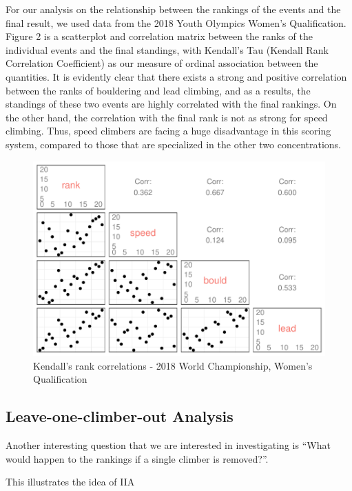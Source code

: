 \documentclass[12pt]{article}
\begin{document}
For our analysis on the relationship between the rankings of the events
and the final result, we used data from the 2018 Youth Olympics Women's
Qualification. Figure 2 is a scatterplot and correlation matrix between
the ranks of the individual events and the final standings, with
Kendall's Tau (Kendall Rank Correlation Coefficient) as our measure of
ordinal association between the quantities. It is evidently clear that
there exists a strong and positive correlation between the ranks of
bouldering and lead climbing, and as a results, the standings of these
two events are highly correlated with the final rankings. On the other
hand, the correlation with the final rank is not as strong for speed
climbing. Thus, speed climbers are facing a huge disadvantage in this
scoring system, compared to those that are specialized in the other two
concentrations.

\begin{figure}
\centering
\includegraphics{draft_files/figure-latex/unnamed-chunk-9-1.pdf}
\caption{Kendall's rank correlations - 2018 World Championship, Women's
Qualification}
\end{figure}

\hypertarget{leave-one-climber-out-analysis}{%
\subsection{Leave-one-climber-out
Analysis}\label{leave-one-climber-out-analysis}}

Another interesting question that we are interested in investigating is
``What would happen to the rankings if a single climber is removed?''.

This illustrates the idea of IIA
\end{document}
